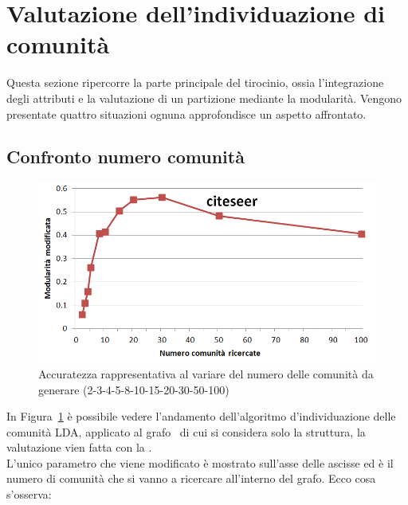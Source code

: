 \section{Valutazione dell'individuazione di comunità}
Questa sezione ripercorre la parte principale del tirocinio, ossia l'integrazione degli attributi e la valutazione di un partizione mediante la modularità. Vengono presentate quattro situazioni ognuna approfondisce un aspetto affrontato.
%
\subsection{Confronto numero comunità}%
%
\begin{figure}[htp]
	\centering
	\includegraphics[width=\linewidth]{immagini/MOD_1_num_cmty}
	\caption{Accuratezza rappresentativa al variare del numero delle comunità da generare (2-3-4-5-8-10-15-20-30-50-100)}
	\label{fig:MOD_1_num_cmty}
\end{figure}
%
In Figura~\ref{fig:MOD_1_num_cmty} è possibile vedere l'andamento dell'algoritmo d'individuazione delle comunità LDA, applicato al grafo \citeseer\ di cui si considera solo la struttura, la valutazione vien fatta con la \mmod.\\
L'unico parametro che viene modificato è mostrato sull'asse delle ascisse ed è il numero di comunità che si vanno a ricercare all'interno del grafo. Ecco cosa s'osserva:
